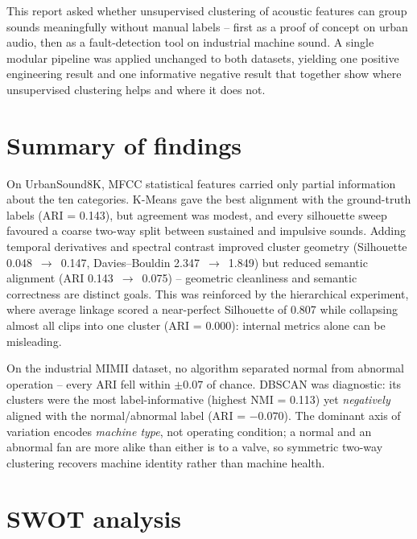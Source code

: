 \documentclass[runningheads,a4paper,11pt]{report}
\begin{document}
This report asked whether unsupervised clustering of acoustic features can group sounds meaningfully without manual labels -- first as a proof of concept on urban audio, then as a fault-detection tool on industrial machine sound. A single modular pipeline was applied unchanged to both datasets, yielding one positive engineering result and one informative negative result that together show where unsupervised clustering helps and where it does not.

\section{Summary of findings}
\label{section:summaryFindings}

On UrbanSound8K, MFCC statistical features carried only partial information about the ten categories. K-Means gave the best alignment with the ground-truth labels (ARI = 0.143), but agreement was modest, and every silhouette sweep favoured a coarse two-way split between sustained and impulsive sounds. Adding temporal derivatives and spectral contrast improved cluster geometry (Silhouette 0.048~$\rightarrow$~0.147, Davies--Bouldin 2.347~$\rightarrow$~1.849) but reduced semantic alignment (ARI 0.143~$\rightarrow$~0.075) -- geometric cleanliness and semantic correctness are distinct goals. This was reinforced by the hierarchical experiment, where average linkage scored a near-perfect Silhouette of 0.807 while collapsing almost all clips into one cluster (ARI = 0.000): internal metrics alone can be misleading.

On the industrial MIMII dataset, no algorithm separated normal from abnormal operation -- every ARI fell within $\pm0.07$ of chance. DBSCAN was diagnostic: its clusters were the most label-informative (highest NMI = 0.113) yet \emph{negatively} aligned with the normal/abnormal label (ARI = $-0.070$). The dominant axis of variation encodes \emph{machine type}, not operating condition; a normal and an abnormal fan are more alike than either is to a valve, so symmetric two-way clustering recovers machine identity rather than machine health.

\section{SWOT analysis}
\label{section:swot}
\end{document}
